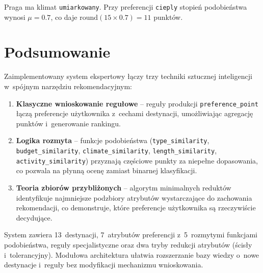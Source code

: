 \documentclass[12pt,a4paper]{article}
\begin{document}
Praga ma klimat \texttt{umiarkowany}. Przy preferencji \texttt{cieply} stopień podobieństwa wynosi $\mu = 0.7$, co daje $\text{round}(15 \times 0.7) = 11$ punktów.

\section{Podsumowanie}

Zaimplementowany system ekspertowy łączy trzy techniki sztucznej inteligencji w~spójnym narzędziu rekomendacyjnym:

\begin{enumerate}
    \item \textbf{Klasyczne wnioskowanie regułowe} -- reguły produkcji \texttt{preference\_point} łączą preferencje użytkownika z~cechami destynacji, umożliwiając agregację punktów i~generowanie rankingu.

    \item \textbf{Logika rozmyta} -- funkcje podobieństwa (\texttt{type\_similarity}, \texttt{budget\_similarity}, \texttt{climate\_similarity}, \texttt{length\_similarity}, \texttt{activity\_similarity}) przyznają częściowe punkty za niepełne dopasowania, co pozwala na płynną ocenę zamiast binarnej klasyfikacji.

    \item \textbf{Teoria zbiorów przybliżonych} -- algorytm minimalnych reduktów identyfikuje najmniejsze podzbiory atrybutów wystarczające do zachowania rekomendacji, co demonstruje, które preferencje użytkownika są rzeczywiście decydujące.
\end{enumerate}

System zawiera 13~destynacji, 7~atrybutów preferencji z~5~rozmytymi funkcjami podobieństwa, reguły specjalistyczne oraz dwa tryby redukcji atrybutów (ścisły i~tolerancyjny). Modułowa architektura ułatwia rozszerzanie bazy wiedzy o~nowe destynacje i~reguły bez modyfikacji mechanizmu wnioskowania.
\end{document}
